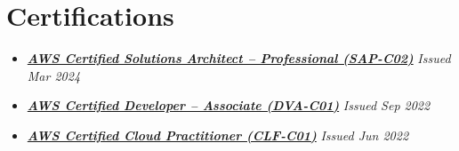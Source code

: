 \documentclass[10pt,a4paper]{article}
\begin{document}
\section*{Certifications}
\begin{itemize}
  \item \href{https://www.credly.com/badges/6e22a6c0-9922-49d5-b59f-34cc593c82c3/public_url}{\textbf{\textit{AWS Certified Solutions Architect -- Professional (SAP-C02)}}} \hfill \textit{Issued Mar 2024}
  \item \href{https://www.credly.com/badges/84671bf4-ce9f-4d8b-a0de-0ef606ad5646/public_url}{\textbf{\textit{AWS Certified Developer -- Associate (DVA-C01)}}} \hfill \textit{Issued Sep 2022}
  \item \href{https://www.credly.com/badges/e671b9de-e72a-48cb-82fc-33776c285174/public_url}{\textbf{\textit{AWS Certified Cloud Practitioner (CLF-C01)}}} \hfill \textit{Issued Jun 2022}
\end{itemize}
\end{document}

